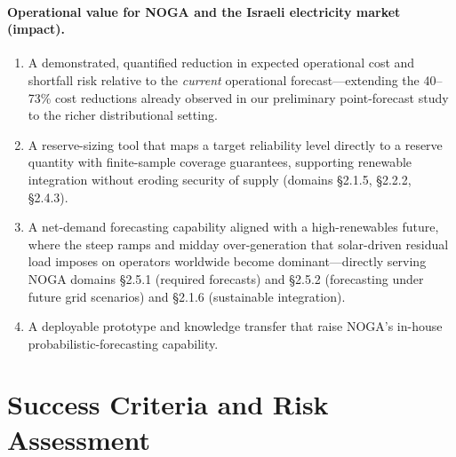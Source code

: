 \documentclass[12pt,a4paper]{article}
\begin{document}
\paragraph{Operational value for NOGA and the Israeli electricity market (impact).}
\begin{enumerate}[leftmargin=1.6em]
    \item A demonstrated, quantified reduction in expected operational cost and shortfall
        risk relative to the \emph{current} operational forecast---extending the
        40--73\% cost reductions already observed in our preliminary point-forecast study
        to the richer distributional setting.
    \item A reserve-sizing tool that maps a target reliability level directly to a reserve
        quantity with finite-sample coverage guarantees, supporting renewable integration
        without eroding security of supply (domains \S2.1.5, \S2.2.2, \S2.4.3).
    \item A net-demand forecasting capability aligned with a high-renewables future, where
        the steep ramps and midday over-generation that solar-driven residual load imposes
        on operators worldwide \parencite{denholm2015overgeneration} become dominant---directly serving NOGA
        domains \S2.5.1 (required forecasts) and \S2.5.2 (forecasting under future
        grid scenarios) and \S2.1.6 (sustainable integration).
    \item A deployable prototype and knowledge transfer that raise NOGA's in-house
        probabilistic-forecasting capability.
\end{enumerate}

\section{Success Criteria and Risk Assessment}
\label{sec:risks}
\end{document}
